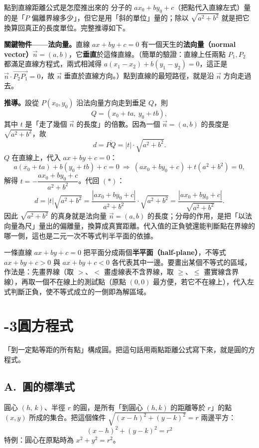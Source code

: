 \documentclass[11pt]{article}
\begin{document}
\begin{延伸框}{點到直線距離公式是怎麼推出來的}
分子的 $ax_0+by_0+c$（把點代入直線左式）量的是「$P$ 偏離界線多少」，但它是用「斜的單位」量的；除以 $\sqrt{a^2+b^2}$ 就是把它換算回真正的長度單位。完整推導如下。

\textbf{關鍵物件——法向量。}直線 $ax+by+c=0$ 有一個天生的\textbf{法向量（normal vector）}$\vec n=(a,b)$，它\textbf{垂直}於這條直線。（簡單的驗證：直線上任兩點 $P_1,P_2$ 都滿足直線方程式，兩式相減得 $a(x_1-x_2)+b(y_1-y_2)=0$，這正是 $\vec n\cdot\overrightarrow{P_2P_1}=0$，故 $\vec n$ 垂直於直線方向。）點到直線的最短路徑，就是沿 $\vec n$ 方向走過去。

\textbf{推導。}設從 $P(x_0,y_0)$ 沿法向量方向走到垂足 $Q$，則
$$Q=(x_0+ta,\ y_0+tb),$$
其中 $t$ 是「走了幾個 $\vec n$ 的長度」的倍數。因為一個 $\vec n=(a,b)$ 的長度是 $\sqrt{a^2+b^2}$，故
\begin{equation}
d=\overline{PQ}=|t|\cdot\sqrt{a^2+b^2}.\tag{$*$}
\end{equation}
$Q$ 在直線上，代入 $ax+by+c=0$：
$$a(x_0+ta)+b(y_0+tb)+c=0\ \Longrightarrow\ (ax_0+by_0+c)+t(a^2+b^2)=0,$$
解得 $t=-\dfrac{ax_0+by_0+c}{a^2+b^2}$。代回 $(*)$：
$$d=|t|\sqrt{a^2+b^2}=\frac{|ax_0+by_0+c|}{a^2+b^2}\cdot\sqrt{a^2+b^2}=\frac{|ax_0+by_0+c|}{\sqrt{a^2+b^2}}.$$
因此 $\sqrt{a^2+b^2}$ 的真身就是法向量 $\vec n=(a,b)$ 的長度；分母的作用，是把「以法向量為尺」量出的偏離量，換算成真實距離。代入值的正負號還能判斷點在界線的哪一側，這也是二元一次不等式判半平面的依據。
\end{延伸框}

一條直線 $ax+by+c=0$ 把平面分成兩個\textbf{半平面（half-plane）}，不等式 $ax+by+c>0$ 與 $ax+by+c<0$ 各代表其中一邊。要畫出某個不等式的區域，作法是：先畫界線（取 $>$、$<$ 畫虛線表不含界線，取 $\ge$、$\le$ 畫實線含界線），再取一個不在線上的測試點（原點 $(0,0)$ 最方便，若它不在線上），代入左式判斷正負，使不等式成立的一側即為解區域。

\section*{-3\quad 圓方程式}

「到一定點等距的所有點」構成圓。把這句話用兩點距離公式寫下來，就是圓的方程式。

\subsection*{\sffamily A.\ 圓的標準式}

圓心 $(h,\,k)$、半徑 $r$ 的圓，是所有「到圓心 $(h,k)$ 的距離等於 $r$」的點 $(x,y)$ 所成的集合。把這個條件 $\sqrt{(x-h)^2+(y-k)^2}=r$ 兩邊平方：
$$\boxed{\;(x-h)^2+(y-k)^2=r^2\;}$$
特例：圓心在原點時為 $x^2+y^2=r^2$。
\end{document}
